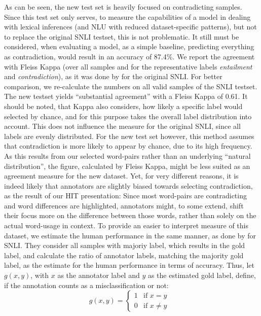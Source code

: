 As can be seen, the new test set is heavily focused on contradicting samples. Since this test set only serves, to measure the capabilities of a model in dealing with lexical inferences (and \ac{NLU} with reduced dataset-specific patterns), but not to replace the original \ac{SNLI} testset, this is not problematic. It still must be considered, when evaluating a model, as a simple baseline, predicting everything as contradiction, would result in an accuracy of 87.4\%. We report the agreement with Fleiss Kappa \citep{landis1977measurement} (over all samples and for the representative labels \textit{entailment} and \textit{contradiction}), as it was done by \cite{bowman2015large} for the original \ac{SNLI}. For better comparison, we re-calculate the numbers on all valid samples of the \ac{SNLI} testset. The new testset yields ``substantial agreement'' with a Fleiss Kappa of 0.61. It should be noted, that Kappa also considers, how likely a specific label would selected by chance, and for this purpose takes the overall label distribution into account. This does not influence the measure for the original \ac{SNLI}, since all labels are evenly distributed. For the new test set however, this method assumes that contradiction is more likely to appear by chance, due to its high frequency. As this results from our selected word-pairs rather than an underlying ``natural distribution'', the figure, calculated by Fleiss Kappa, might be less suited as an agreement measure for the new dataset. Yet, for very different reasons, it is indeed likely that annotators are slightly biased towards selecting contradiction, as the result of our \ac{HIT} presentation: Since most word-pairs are contradicting and word differences are highlighted, annotators might, to some extend, shift their focus more on the difference between those words, rather than solely on the actual word-usage in context. To provide an easier to interpret measure of this dataset, we estimate the human performance in the same manner, as done by \cite{gong2017natural} for \ac{SNLI}. They consider all samples with majoriy label, which results in the gold label, and calculate the ratio of annotator labels, matching the majority gold label, as the estimate for the human performance in terms of accuracy. Thus, let $g(x,y)$, with $x$ as the annotator label and $y$ as the estimated gold label, define, if the annotation counts as a misclassification or not:
\begin{equation}
g(x,y) = \begin{cases}
1 & \text{if $x = y$} \\
0 & \text{if $x \neq y$ }
\end{cases}
\end{equation}
